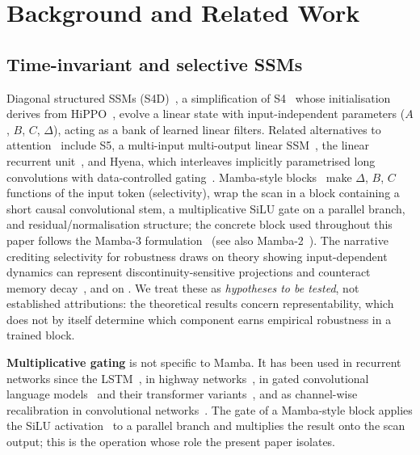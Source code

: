 \section{Background and Related Work}
\label{sec:background}

\subsection{Time-invariant and selective SSMs}
\label{sec:background:ssms}

Diagonal structured SSMs (S4D)~\cite{gu2022s4d}, a simplification of S4~\cite{gu2022s4} whose initialisation derives from HiPPO~\cite{gu2020hippo}, evolve a linear state with input-independent parameters ($A$, $B$, $C$, $\Delta$), acting as a bank of learned linear filters. Related alternatives to attention~\cite{vaswani2017attention} include S5, a multi-input multi-output linear SSM~\cite{smith2023s5}, the linear recurrent unit~\cite{orvieto2023lru}, and Hyena, which interleaves implicitly parametrised long convolutions with data-controlled gating~\cite{poli2023hyena}. Mamba-style blocks~\cite{gu2023mamba} make $\Delta$, $B$, $C$ functions of the input token (selectivity), wrap the scan in a block containing a short causal convolutional stem, a multiplicative SiLU gate on a parallel branch, and residual/normalisation structure; the concrete block used throughout this paper follows the Mamba-3 formulation~\cite{lahoti2026mamba3} (see also Mamba-2~\cite{dao2024mamba2}). The narrative crediting selectivity for robustness draws on theory showing input-dependent dynamics can represent discontinuity-sensitive projections and counteract memory decay~\cite{huang2025selectivity}, and on \cite{shandirasegaran2026trainingdynamics}. We treat these as \emph{hypotheses to be tested}, not established attributions: the theoretical results concern representability, which does not by itself determine which component earns empirical robustness in a trained block.

\textbf{Multiplicative gating} is not specific to Mamba. It has been used in recurrent networks since the LSTM~\cite{hochreiter1997lstm}, in highway networks~\cite{srivastava2015highway}, in gated convolutional language models~\cite{dauphin2017glu} and their transformer variants~\cite{shazeer2020glu}, and as channel-wise recalibration in convolutional networks~\cite{hu2018senet}. The gate of a Mamba-style block applies the SiLU activation~\cite{hendrycks2016gelu,ramachandran2017swish} to a parallel branch and multiplies the result onto the scan output; this is the operation whose role the present paper isolates.

